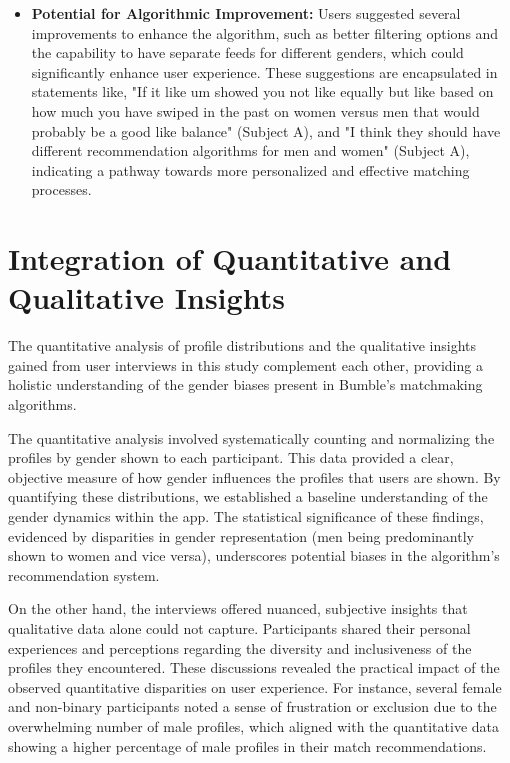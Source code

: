 \begin{itemize}
    \item \textbf{Potential for Algorithmic Improvement:} Users suggested several improvements to enhance the algorithm, such as better filtering options and the capability to have separate feeds for different genders, which could significantly enhance user experience. These suggestions are encapsulated in statements like, "If it like um showed you not like equally but like based on how much you have swiped in the past on women versus men that would probably be a good like balance" (Subject A), and "I think they should have different recommendation algorithms for men and women" (Subject A), indicating a pathway towards more personalized and effective matching processes.
\end{itemize}  

\section{Integration of Quantitative and Qualitative Insights}
The quantitative analysis of profile distributions and the qualitative insights gained from user interviews in this study complement each other, providing a holistic understanding of the gender biases present in Bumble's matchmaking algorithms.

The quantitative analysis involved systematically counting and normalizing the profiles by gender shown to each participant. This data provided a clear, objective measure of how gender influences the profiles that users are shown. By quantifying these distributions, we established a baseline understanding of the gender dynamics within the app. The statistical significance of these findings, evidenced by disparities in gender representation (men being predominantly shown to women and vice versa), underscores potential biases in the algorithm's recommendation system.

On the other hand, the interviews offered nuanced, subjective insights that qualitative data alone could not capture. Participants shared their personal experiences and perceptions regarding the diversity and inclusiveness of the profiles they encountered. These discussions revealed the practical impact of the observed quantitative disparities on user experience. For instance, several female and non-binary participants noted a sense of frustration or exclusion due to the overwhelming number of male profiles, which aligned with the quantitative data showing a higher percentage of male profiles in their match recommendations.

